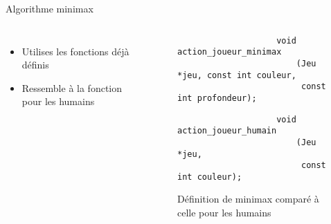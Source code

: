 \documentclass{beamer}
\begin{document}
\begin{frame}[fragile]{Algorithme minimax}
\begin{onlyenv}
    \end{onlyenv}
    \begin{columns}[onlytextwidth]
        \def\rcolumn{50mm} %
        \column{\linewidth-\rcolumn-1cm} %
        \begin{itemize}
            \item<1-2> Utilises les fonctions déjà définis
            \item<2> Ressemble à la fonction pour les humains
        \end{itemize}
        \column{\rcolumn} %
        \begin{overprint}
            \begin{figure}
                \vspace{15mm}
                \begin{verbatim}
                    void action_joueur_minimax
                        (Jeu *jeu, const int couleur,
                         const int profondeur);
                \end{verbatim}
                \vspace{1mm}
                \begin{verbatim}
                    void action_joueur_humain
                        (Jeu *jeu,
                         const int couleur);
                \end{verbatim}
                \caption*{Définition de minimax comparé à celle pour les humains}
            \end{figure}
        \end{overprint}
    \end{columns}
\end{frame}
\end{document}
